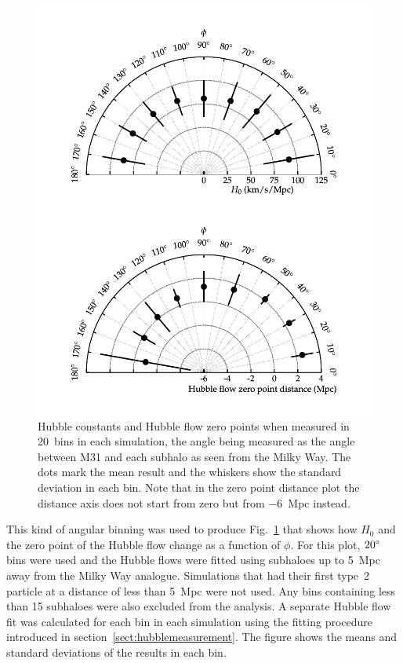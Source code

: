 \documentclass[english, oneside]{HYgradu}
\begin{document}
\begin{figure}
    \centering
    \includegraphics{kuvat/directionalHF.pdf}
    \caption{Hubble constants and Hubble flow zero points when measured in 20\textdegree\ bins in each simulation, the angle being measured as the angle between M31 and each subhalo as seen from the Milky Way. The dots mark the mean result and the whiskers show the standard deviation in each bin. Note that in the zero point distance plot the distance axis does not start from zero but from $-6$~Mpc instead.}\label{fig:directionalHF}
\end{figure}

This kind of angular binning was used to produce Fig.~\ref{fig:directionalHF} that shows how $H_0$ and the zero point of the Hubble flow change as a function of $\phi$. For this plot, $20 \degree$ bins were used and the Hubble flows were fitted using subhaloes up to 5~Mpc away from the Milky Way analogue. Simulations that had their first type~2 particle at a distance of less than 5~Mpc were not used. Any bins containing less than 15 subhaloes were also excluded from the analysis. A separate Hubble flow fit was calculated for each bin in each simulation using the fitting procedure introduced in section~\ref{sect:hubblemeasurement}. The figure shows the means and standard deviations of the results in each bin.
\end{document}
